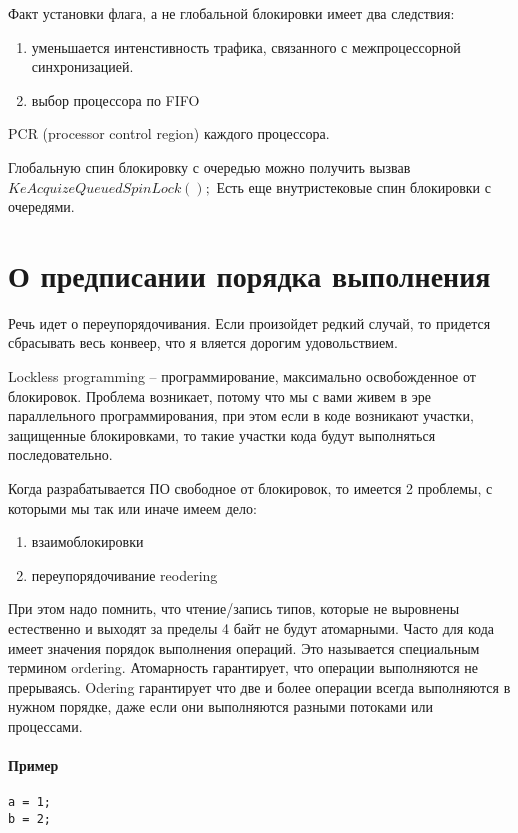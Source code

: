 Факт установки флага, а не глобальной блокировки имеет два следствия:
\begin{enumerate}
	\item уменьшается интенстивность трафика, связанного с межпроцессорной  синхронизацией.
	\item выбор процессора по FIFO
\end{enumerate}

PCR (processor control region) каждого процессора. 

Глобальную спин блокировку с очередью можно получить вызвав $KeAcquizeQueuedSpinLock();$ 
Есть еще внутристековые спин блокировки с очередями.

\section{О предписании порядка выполнения}
Речь идет о переупорядочивания. Если произойдет редкий случай, то придется сбрасывать весь конвеер, что я вляется дорогим удовольствием.
 

Lockless programming – программирование, максимально освобожденное от блокировок. Проблема возникает, потому что мы с вами живем в эре параллельного программирования, при этом  если в коде возникают участки, защищенные блокировками, то такие участки кода будут выполняться последовательно.

Когда разрабатывается ПО свободное от блокировок, то имеется 2 проблемы, с которыми мы так или иначе имеем дело:
\begin{enumerate}
	\item взаимоблокировки
	\item переупорядочивание reodering
\end{enumerate}

При этом надо помнить, что чтение/запись типов, которые не выровнены естественно и выходят за пределы 4 байт не будут атомарными. Часто для кода имеет значения порядок выполнения операций. Это называется специальным термином ordering. Атомарность гарантирует, что операции выполняются не прерываясь. Odering гарантирует что две и более операции всегда выполняются в нужном порядке, даже если они выполняются разными потоками или процессами.

\paragraph{Пример}

\begin{lstlisting}[caption=listing, label=code_reodering]
a = 1;
b = 2;
\end{lstlisting}

